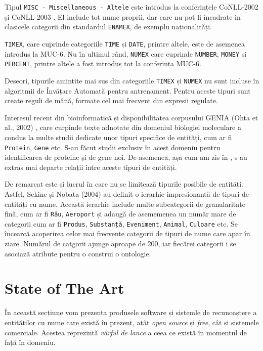 Tipul \texttt{MISC - Miscellaneous - Altele} este introdus la conferințele CoNLL-2002 și CoNLL-2003 \cite{conll2003}. El include tot nume proprii, dar care nu pot fi încadrate in clasicele categorii din standardul \texttt{ENAMEX}, de exemplu naționalități.

\texttt{TIMEX}, care cuprinde categoriile \texttt{TIME} și \texttt{DATE}, printre altele, este de asemenea introdus la MUC-6. Nu în ultimul rând, \texttt{NUMEX} care cuprinde \texttt{NUMBER}, \texttt{MONEY} și \texttt{PERCENT}, printre altele a fost introdus tot la conferința MUC-6.

Deseori, tipurile amintite mai sus din categoriile \texttt{TIMEX} și \texttt{NUMEX} nu sunt incluse în algoritmii de Învățare Automată pentru antrenament. Pentru aceste tipuri sunt create reguli de mână, formate cel mai frecvent din expresii regulate.


Interesul recent din bioinformatică și disponibilitatea corpusului GENIA (Ohta et al., 2002) \cite{Ohta02thegenia}, care curpinde texte adnotate din domeniul biologiei moleculare a condus la multe studii dedicate unor tipuri specifice de entități, cum ar fi \texttt{Protein}, \texttt{Gene} etc. S-au făcut studii exclusiv în acest domeniu pentru identificarea de proteine și de gene noi. De asemenea, așa cum am zis în , s-au extras mai departe relații între aceste tipuri de entități.


De remarcat este și lucrul în care nu se limitează tipurile posibile de entități. Astfel, Sekine și Nobata (2004) au definit o ierarhie impresionantă de tipuri de entități cu nume. Această ierarhie include multe subcategorii de granularitate fină, cum ar fi \texttt{Râu}, \texttt{Aeroport} și adaugă de asememenea un număr mare de categorii cum ar fi \texttt{Produs}, \texttt{Substanță}, \texttt{Eveniment}, \texttt{Animal}, \texttt{Culoare} etc. Se încearcă acoperirea celor mai frecvente categorii de tipuri de nume care apar în ziare. Numărul de catgorii ajunge aproape de 200, iar fiecărei categorii i se asociază atribute pentru o construi o ontologie. \cite{sekine2004}

\section{State of The Art}

În această secțiune vom prezenta produsele software și sistemle de recunoaștere a entităților cu nume care există în prezent, atât \textit{open source} și \textit{free}, cât și sistemele comerciale. Acestea reprezintă \textit{vârful de lance} a ceea ce există în momentul de față în domeniu. 

